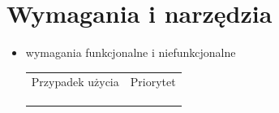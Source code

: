 \documentclass[a4paper,twoside,12pt]{book}
\begin{document}


\chapter{Wymagania i narzędzia}
\label{ch:wymagania-i-narzedzia}

\begin{itemize}
\item wymagania funkcjonalne i niefunkcjonalne
\label{id:tab:wyniki}
\begin{table}[]
\centering
\begin{tabular}{ll}
Przypadek użycia & Priorytet \\
    &           \\
                 &           \\
                 &          
\end{tabular}
\end{table}


\end{itemize}
\end{document}

